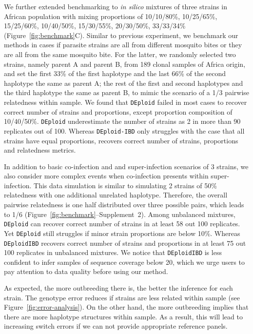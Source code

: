 \documentclass[9pt,lineno]{elife}
\begin{document}
We further extended benchmarking to \emph{in silico} mixtures of three strains in African population with mixing proportions of 10/10/80\%, 10/25/65\%, 15/25/60\%, 10/40/50\%,
15/30/55\%, 20/30/50\%, 33/33/34\% (Figure~\ref{fig:benchmark}C). Similar to previous experiment, we benchmark our methods in cases if parasite strains are all from different mosquito bites or they are all from the same mosquito bite. For the latter, we randomly selected two strains, namely parent A and parent B, from 189 clonal samples of Africa origin, and set the first 33\% of the first haplotype and the last 66\% of the second haplotype the same as parent A; the rest of the first and second haplotypes and the third haplotype the same as parent B, to mimic the scenario of a 1/3 pairwise relatedness within sample. We found that {\tt DEploid} failed in most cases to recover correct number of strains and proportions, except proportion composition of 10/40/50\%. {\tt DEploid} underestimate the number of strains as 2 in more than 90 replicates out of 100. Whereas {\tt DEploid-IBD} only struggles with the case that all strains have equal proportions, recovers correct number of strains, proportions and relatedness metrics.

In addition to basic co-infection and and super-infection scenarios of 3 strains, we also consider more complex events when co-infection presents within super-infection. This data simulation is similar to simulating 2 strains of 50\% relatedness with one additional unrelated haplotype. Therefore, the overall pairwise relatedness is one half distributed over three possible pairs, which leads to 1/6 (Figure~\ref{fig:benchmark}--Supplement~2). Among unbalanced mixtures, {\tt DEploid} can recover correct number of strains in at least 58 out 100 replicates. Yet {\tt DEploid} still struggles if minor strain proportions are below 10\%. Whereas {\tt DEploidIBD} recovers correct number of strains and proportions in at least 75 out 100 replicates in unbalanced mixtures. We notice that {\tt DEploidIBD} is less confident to infer samples of sequence coverage below 20, which we urge users to pay attention to data quality before using our method.

As expected, the more outbreeding there is, the better the inference for each strain. The genotype error reduces if strains are less related within sample (see Figure~\ref{fig:error-analysis}). On the other hand, the more outbreeding implies that there are more haplotype structures within sample. As a result, this will lead to increasing switch errors if we can not provide appropriate reference panels.
\end{document}

